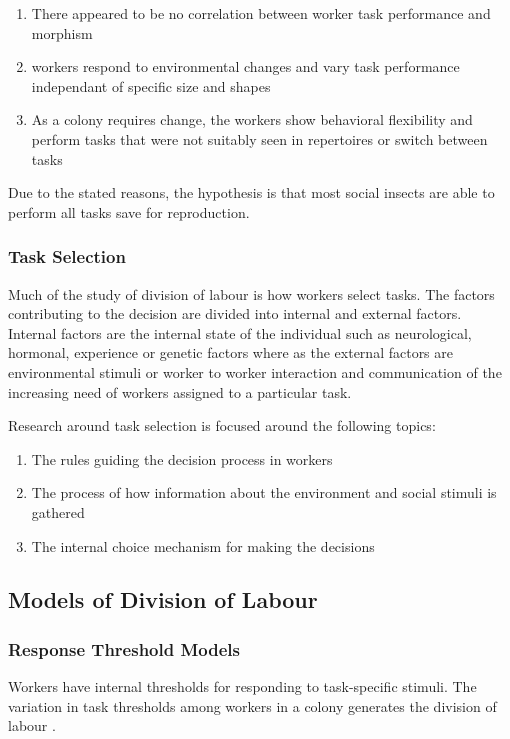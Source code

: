 \begin{enumerate}
	\item There appeared to be no correlation between worker task performance and morphism
	\item workers respond to environmental changes and vary task performance independant of specific size and shapes
	\item As a colony requires change, the workers show behavioral flexibility and perform tasks that were not suitably seen in repertoires or switch between tasks

\end{enumerate}

Due to the stated reasons, the hypothesis is that most social insects are able to perform all tasks save for reproduction.

\subsubsection{Task Selection}
Much of the study of division of labour is how workers select tasks. The factors contributing to the decision are divided into internal and external factors. Internal factors are the internal state of the individual such as neurological, hormonal, experience or genetic factors where as the external factors are environmental stimuli or worker to worker interaction and communication of the increasing need of workers assigned to a particular task. \cite{beshers2001models}

Research around task selection is focused around the following topics: 
\begin{enumerate}
	\item The rules guiding the decision process in workers
	\item The process of how information about the environment and social stimuli is gathered
	\item The internal choice mechanism for making the decisions
\end{enumerate}

\subsection{Models of Division of Labour}
\subsubsection{Response Threshold Models}

Workers have internal thresholds for responding to task-specific stimuli. The variation in task thresholds among workers in a colony generates the division of labour \cite{robinson1992regulation}. %

